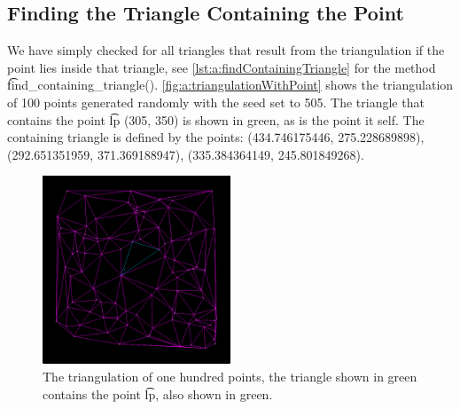 \subsection*{Finding the Triangle Containing the Point}
We have simply checked for all triangles that result from the triangulation if the point lies inside that triangle, see \autoref{lst:a:findContainingTriangle} for the method \t{find_containing_triangle()}. \autoref{fig:a:triangulationWithPoint} shows the triangulation of 100 points generated randomly with the seed set to 505. The triangle that contains the point \t{lp} (305, 350) is shown in green, as is the point it self. The containing triangle is defined by the points: (\num{434.746175446}, \num{275.228689898}), (\num{292.651351959}, \num{371.369188947}), (\num{335.384364149}, \num{245.801849268}).

\begin{figure}
	\centering
	\includegraphics[width=0.5\textwidth]{./img/a_triangulationWithPoint}
	\caption{The triangulation of one hundred points, the triangle shown in green contains the point \t{lp}, also shown in green.}
	\label{fig:a:triangulationWithPoint}
\end{figure}


